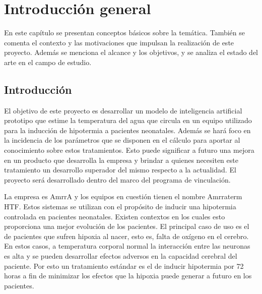 
\chapter{Introducción general} %

En este capítulo se presentan conceptos básicos sobre la temática. También se comenta el contexto y las motivaciones que impulsan la realización de este proyecto. Además se menciona el alcance y los objetivos, y se analiza el estado del arte en el campo de estudio.

\label{Chapter1} %
\label{IntroGeneral}


\newcommand{\keyword}[1]{\textbf{#1}}
\newcommand{\tabhead}[1]{\textbf{#1}}
\newcommand{\code}[1]{\texttt{#1}}
\newcommand{\file}[1]{\texttt{\bfseries#1}}
\newcommand{\option}[1]{\texttt{\itshape#1}}
\newcommand{\grados}{$^{\circ}$}



\section{Introducción}

El objetivo de este proyecto es desarrollar un modelo de inteligencia artificial prototipo que estime la temperatura del agua que circula en un equipo utilizado para la inducción de hipotermia a pacientes neonatales. Además se hará foco en la incidencia de los parámetros que se disponen en el cálculo para aportar al conocimiento sobre estos tratamientos. Esto puede significar a futuro una mejora en un producto que desarrolla la empresa y brindar a quienes necesiten este tratamiento un desarrollo superador del mismo respecto a la actualidad. El proyecto será desarrollado dentro del marco del programa de vinculación. 

La empresa es AmrrA y los equipos en cuestión tienen el nombre Amrraterm HTF. Estos sistemas se utilizan con el propósito de inducir una hipotermia controlada en pacientes neonatales. Existen contextos en los cuales esto proporciona una mejor evolución de los pacientes. El principal caso de uso es el de pacientes que sufren hipoxia al nacer, esto es, falta de oxígeno en el cerebro. En estos casos, a temperatura corporal normal la interacción entre las neuronas es alta y se pueden desarrollar efectos adversos en la capacidad cerebral del paciente. Por esto un tratamiento estándar es el de inducir hipotermia por 72 horas a fin de minimizar los efectos que la hipoxia puede generar a futuro en los pacientes. 

